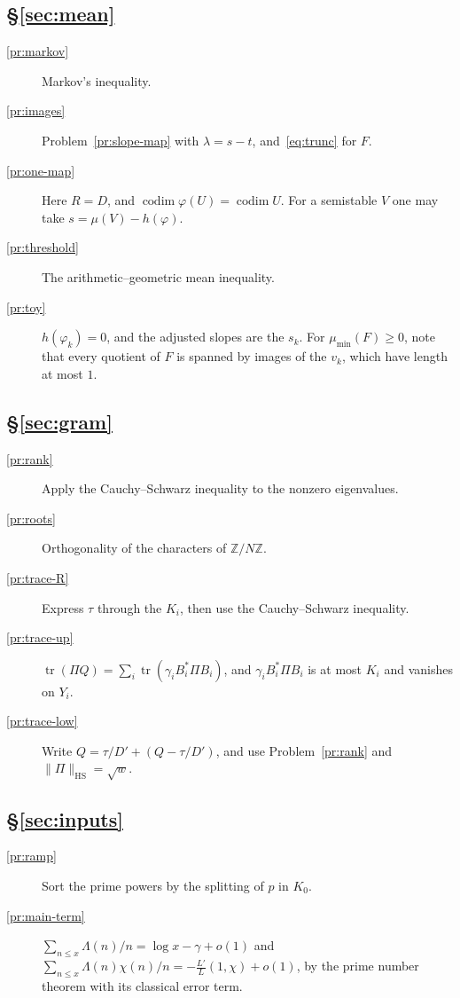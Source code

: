 \documentclass[reqno]{amsart}
\theoremstyle{definition}
\theoremstyle{plain}
\newcommand{\Z}{\mathbb{Z}}
\newcommand{\mumin}{\mu_{\min}}
\newcommand{\codim}{\operatorname{codim}}
\newcommand{\tr}{\operatorname{tr}}
\newcommand{\HS}{\mathrm{HS}}
\begin{document}
\subsection*{\S\ref{sec:mean}}
\begin{description}
\item[\ref{pr:markov}] Markov's inequality.
\item[\ref{pr:images}] Problem~\ref{pr:slope-map} with \(\lambda = s - t\), and~\eqref{eq:trunc} for \(F\).
\item[\ref{pr:one-map}] Here \(R = D\), and \(\codim \varphi(U) = \codim U\).  For a semistable \(V\) one may take \(s = \mu(V) - h(\varphi)\).
\item[\ref{pr:threshold}] The arithmetic--geometric mean inequality.
\item[\ref{pr:toy}] \(h(\varphi_k) = 0\), and the adjusted slopes are the \(s_k\).  For \(\mumin(F) \ge 0\), note that every quotient of \(F\) is spanned by images of the \(v_k\), which have length at most \(1\).
\end{description}

\subsection*{\S\ref{sec:gram}}
\begin{description}
\item[\ref{pr:rank}] Apply the Cauchy--Schwarz inequality to the nonzero eigenvalues.
\item[\ref{pr:roots}] Orthogonality of the characters of \(\Z/N\Z\).
\item[\ref{pr:trace-R}] Express \(\tau\) through the \(K_i\), then use the Cauchy--Schwarz inequality.
\item[\ref{pr:trace-up}] \(\tr(\Pi Q) = \sum_i \tr(\gamma_i B_i^*\Pi B_i)\), and \(\gamma_i B_i^* \Pi B_i\) is at most \(K_i\) and vanishes on \(Y_i\).
\item[\ref{pr:trace-low}] Write \(Q = \tau/D' + (Q - \tau/D')\), and use Problem~\ref{pr:rank} and \(\lVert \Pi \rVert_\HS = \sqrt w\).
\end{description}

\subsection*{\S\ref{sec:inputs}}
\begin{description}
\item[\ref{pr:ramp}] Sort the prime powers by the splitting of \(p\) in \(K_0\).
\item[\ref{pr:main-term}] \(\sum_{n \le x} \Lambda(n)/n = \log x - \gamma + o(1)\) and \(\sum_{n \le x} \Lambda(n)\chi(n)/n = -\tfrac{L'}{L}(1, \chi) + o(1)\), by the prime number theorem with its classical error term.
\end{description}
\end{document}

